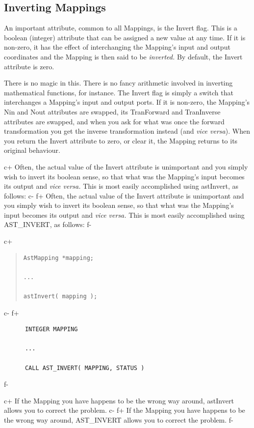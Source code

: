 \documentclass[twoside,11pt]{article}
\begin{document}
\subsection{\label{ss:invertingmappings}Inverting Mappings}

An important attribute, common to all Mappings, is the Invert
flag. This is a boolean (integer) attribute that can be assigned a new
value at any time. If it is non-zero, it has the effect of
interchanging the Mapping's input and output coordinates and the
Mapping is then said to be {\em{inverted.}} By default, the Invert
attribute is zero.

There is no magic in this. There is no fancy arithmetic involved in
inverting mathematical functions, for instance. The Invert flag is
simply a switch that interchanges a Mapping's input and output
ports. If it is non-zero, the Mapping's Nin and Nout attributes are
swapped, its TranForward and TranInverse attributes are swapped, and
when you ask for what was once the forward transformation you get the
inverse transformation instead (and {\em{vice versa}}). When you
return the Invert attribute to zero, or clear it, the Mapping returns
to its original behaviour.

c+
Often, the actual value of the Invert attribute is unimportant and you
simply wish to invert its boolean sense, so that what was the
Mapping's input becomes its output and {\em{vice versa.}} This is most
easily accomplished using astInvert, as follows:
c-
f+
Often, the actual value of the Invert attribute is unimportant and you
simply wish to invert its boolean sense, so that what was the
Mapping's input becomes its output and {\em{vice versa.}} This is most
easily accomplished using AST\_INVERT, as follows:
f-

c+
\begin{quote}
\small
\begin{verbatim}
AstMapping *mapping;

...

astInvert( mapping );
\end{verbatim}
\normalsize
\end{quote}
c-
f+
\small
\begin{verbatim}
      INTEGER MAPPING

      ...

      CALL AST_INVERT( MAPPING, STATUS )
\end{verbatim}
\normalsize
f-

c+
If the Mapping you have happens to be the wrong way around, astInvert
allows you to correct the problem.
c-
f+
If the Mapping you have happens to be the wrong way around,
AST\_INVERT allows you to correct the problem.
f-
\end{document}
